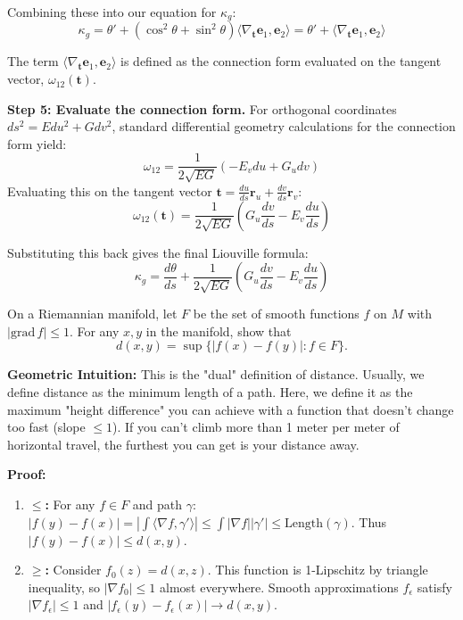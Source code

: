 \begin{solution}
Combining these into our equation for $\kappa_g$:
\[ \kappa_g = \theta' + (\cos^2\theta + \sin^2\theta) \langle \nabla_\mathbf{t} \mathbf{e}_1, \mathbf{e}_2 \rangle = \theta' + \langle \nabla_\mathbf{t} \mathbf{e}_1, \mathbf{e}_2 \rangle \]

The term $\langle \nabla_\mathbf{t} \mathbf{e}_1, \mathbf{e}_2 \rangle$ is defined as the connection form evaluated on the tangent vector, $\omega_{12}(\mathbf{t})$.

\textbf{Step 5: Evaluate the connection form.}
For orthogonal coordinates $ds^2 = E du^2 + G dv^2$, standard differential geometry calculations for the connection form yield:
\[ \omega_{12} = \frac{1}{2\sqrt{EG}} ( -E_v du + G_u dv ) \]
Evaluating this on the tangent vector $\mathbf{t} = \frac{du}{ds}\mathbf{r}_u + \frac{dv}{ds}\mathbf{r}_v$:
\[ \omega_{12}(\mathbf{t}) = \frac{1}{2\sqrt{EG}} \left( G_u \frac{dv}{ds} - E_v \frac{du}{ds} \right) \]

Substituting this back gives the final Liouville formula:
\[ \kappa_g = \frac{d\theta}{ds} + \frac{1}{2\sqrt{EG}} \left( G_u \frac{dv}{ds} - E_v \frac{du}{ds} \right) \]
\end{solution}

\begin{exercise}
\label{geometry:2017:5}
On a Riemannian manifold, let $F$ be the set of smooth functions $f$ on $M$ with $|\mathrm{grad}\,f| \leq 1$. For any $x, y$ in the manifold, show that
\[ d(x, y) = \sup\{|f(x) - f(y)| : f \in F\}. \]
\end{exercise}

\begin{solution}
\textbf{Geometric Intuition:} This is the "dual" definition of distance. Usually, we define distance as the minimum length of a path. Here, we define it as the maximum "height difference" you can achieve with a function that doesn't change too fast (slope $\le 1$). If you can't climb more than 1 meter per meter of horizontal travel, the furthest you can get is your distance away.

\textbf{Proof:}
\begin{enumerate}
    \item \textbf{$\le$:} For any $f \in F$ and path $\gamma$: $|f(y)-f(x)| = |\int \langle \nabla f, \gamma' \rangle| \le \int |\nabla f| |\gamma'| \le \text{Length}(\gamma)$. Thus $|f(y)-f(x)| \le d(x, y)$.
    \item \textbf{$\ge$:} Consider $f_0(z) = d(x, z)$. This function is 1-Lipschitz by triangle inequality, so $|\nabla f_0| \le 1$ almost everywhere. Smooth approximations $f_\epsilon$ satisfy $|\nabla f_\epsilon| \le 1$ and $|f_\epsilon(y)-f_\epsilon(x)| \to d(x, y)$.
\end{enumerate}
\end{solution}

